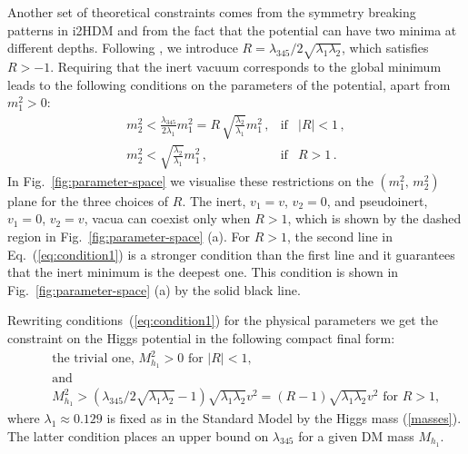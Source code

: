 Another set of theoretical constraints comes from the symmetry breaking patterns in i2HDM \cite{Deshpande:1977rw}
and from the fact that the potential can have two minima at different depths.
Following \cite{Ginzburg:2010wa},
we introduce $R=\lambda_{345}/2\sqrt{\lambda_1\lambda_2}$,
which satisfies $R> -1$.
Requiring that the inert vacuum corresponds to the global minimum
leads to the following conditions on the parameters of the potential, apart from $m_1^2 > 0$:
\begin{eqnarray}
\label{eq:condition1}
m_2^2 < \frac{\lambda_{345}}{2\lambda_1} m_1^2 = R\, \sqrt{\frac{\lambda_2}{\lambda_1}} m_1^2 \,,&\mbox{if}& |R| < 1\,,\nonumber\\ 
m_2^2 < \sqrt{\frac{\lambda_2}{\lambda_1}} m_1^2 \,, &\mbox{if}& R > 1\,.
\end{eqnarray}
In Fig.~\ref{fig:parameter-space} we visualise these restrictions on the $(m_1^2,\, m_2^2)$ plane
for the three choices of $R$.
The inert, $v_1 = v$, $v_2=0$, and pseudoinert, $v_1 = 0$, $v_2 = v$, vacua can coexist only when $R>1$,
which is shown by the dashed region in Fig.~\ref{fig:parameter-space} (a).
For $R > 1$, the second line in Eq.~(\ref{eq:condition1}) is a stronger condition
than the first line and it guarantees that the inert minimum is the deepest one.
This condition is shown in Fig.~\ref{fig:parameter-space} (a) by the solid black line.

Rewriting  conditions~(\ref{eq:condition1}) for the physical parameters 
we get  the constraint on the Higgs potential in the following compact final form:
\begin{eqnarray}
\label{eq:scalar-pot1}
&&\mbox{the trivial one, } M_{h_1}^2 > 0 \mbox{ for } |R|<1, \\
&&\mbox{and}\nonumber\\
\label{eq:scalar-pot2}
&&M_{h_1}^2 > 
  (\lambda_{345}/2\sqrt{\lambda_1\lambda_2}-1) \sqrt{\lambda_1\lambda_2} v^2
=  (R-1) \sqrt{\lambda_1\lambda_2} v^2 \mbox{ for } R>1,
\end{eqnarray}
where $\lambda_1 \approx 0.129$ is fixed as in the Standard Model by the Higgs mass (\ref{masses}). 
The latter condition places an upper bound on $\lambda_{345}$ for a given DM mass $M_{h_1}$.
